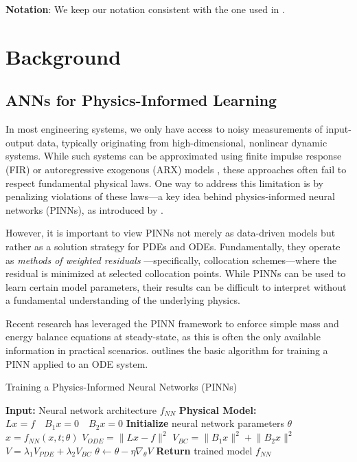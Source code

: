 \documentclass[fontsize=11pt]{article}
\newcommand{\norm}[1]{\lVert #1 \rVert}
\theoremstyle{definition}
\begin{document}
\noindent \textbf{Notation}: We keep our notation consistent with the one used in
\cite{ rawlings:mayne:diehl:2020}.

\section{Background}

\subsection{ANNs for Physics-Informed Learning}

In most engineering systems, we only have access to noisy measurements of 
input-output data, typically originating from high-dimensional, nonlinear dynamic 
systems. While such systems can be approximated using finite impulse response (FIR) 
or autoregressive exogenous (ARX) models \citep{ljung:1999}, these approaches often fail to respect 
fundamental physical laws. One way to address this limitation is by penalizing 
violations of these laws—a key idea behind physics-informed neural networks (PINNs), 
as introduced by \cite{raissi:perdikaris:karniadakis:2019}.

However, it is important to view PINNs not merely as data-driven models but 
rather as a solution strategy for PDEs and ODEs. Fundamentally, they operate 
as \textit{methods of weighted residuals} \citep{villadsen:stewart:1967}—specifically, collocation schemes—where 
the residual is minimized at selected collocation points. While PINNs can be 
used to learn certain model parameters, their results can be difficult to interpret 
without a fundamental understanding of the underlying physics.

Recent research has leveraged the PINN framework to enforce simple mass and energy 
balance equations at steady-state, as this is often the only available information 
in practical scenarios.  outlines the basic algorithm for training 
a PINN applied to an ODE system.

\begin{algorithm}[h]
\caption{Training a Physics-Informed Neural Networks (PINNs)}
\label{alg:PINNs}
\begin{algorithmic}[1]
\State \textbf{Input:} Neural network architecture $f_{NN}$
\State \textbf{Physical Model:} $Lx=f \quad B_1 x = 0 \quad B_2 x = 0$
\State \textbf{Initialize} neural network parameters $\theta$
\Repeat
    \State $x = f_{NN}(x,t; \theta)$
    \State $V_{ODE} = \norm{Lx - f}^{2}$ 
    \State $V_{BC} = \norm{B_1 x}^{2} + \norm{B_2 x}^{2}$
    \State $V = \lambda_1 V_{PDE}  + \lambda_2 V_{BC}$
    \State $\theta \leftarrow \theta - \eta \nabla_{\theta} V$
\State \textbf{Return} trained model $f_{NN}$
\end{algorithmic}
\end{algorithm}
    
\end{document}
